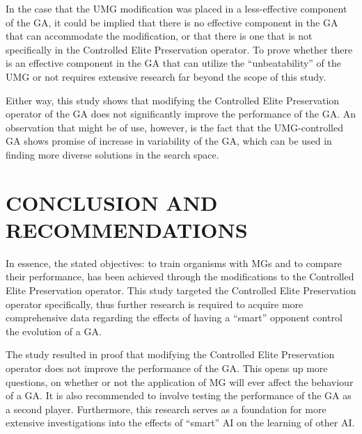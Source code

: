 \documentclass{strrespaper-trad}
\begin{document}
		In the case that the UMG modification was placed in a less-effective component of the GA, it could be implied that there is no effective component in the GA that can accommodate the modification, or that there is one that is not specifically in the Controlled Elite Preservation operator.
		To prove whether there is an effective component in the GA that can utilize the \enquote{unbeatability} of the UMG or not requires extensive research far beyond the scope of this study.

		Either way, this study shows that modifying the Controlled Elite Preservation operator of the GA does not significantly improve the performance of the GA.
		An observation that might be of use, however, is the fact that the UMG-controlled GA shows promise of increase in variability of the GA, which can be used in finding more diverse solutions in the search space.

	\chapter{CONCLUSION AND RECOMMENDATIONS}
		In essence, the stated objectives: to train organisms with MGs and to compare their performance, has been achieved through the modifications to the Controlled Elite Preservation operator.
		This study targeted the Controlled Elite Preservation operator specifically, thus further research is required to acquire more comprehensive data regarding the effects of having a \enquote{smart} opponent control the evolution of a GA.
		
		The study resulted in proof that modifying the Controlled Elite Preservation operator does not improve the performance of the GA.
		This opens up more questions, on whether or not the application of MG will ever affect the behaviour of a GA.
		It is also recommended to involve testing the performance of the GA as a second player.
		Furthermore, this research serves as a foundation for more extensive investigations into the effects of \enquote{smart} AI on the learning of other AI.

	\literaturecited

	\appendix
\end{document}
